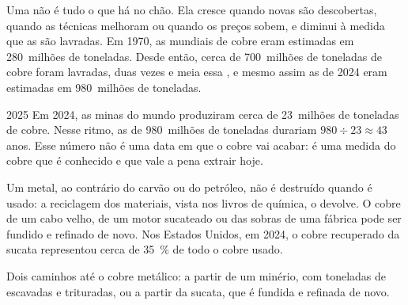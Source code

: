 Uma  não é tudo o que há no chão. Ela cresce quando novas 
são descobertas, quando as técnicas melhoram ou quando os preços sobem, e
diminui à medida que as  são lavradas. Em 1970, as 
mundiais de cobre eram estimadas em 280~milhões de toneladas. Desde
então, cerca de 700~milhões de toneladas de cobre foram lavradas, duas
vezes e meia essa , e mesmo assim as  de 2024 eram
estimadas em 980~milhões de toneladas.

\begin{dated}{2025}
Em 2024, as minas do mundo produziram cerca de 23~milhões de toneladas de
cobre. Nesse ritmo, as  de 980~milhões de toneladas durariam
$980 \div 23
\approx 43$ anos. Esse número não é uma data em que o cobre vai acabar: é
uma medida do cobre que é conhecido e que vale a pena extrair hoje.
\end{dated}

Um metal, ao contrário do carvão ou do petróleo, não é destruído quando
é usado: a reciclagem dos materiais, vista nos livros de química, o
devolve. O cobre de um cabo velho, de um motor sucateado ou das sobras de
uma fábrica pode ser fundido e refinado de novo. Nos Estados Unidos, em
2024, o cobre recuperado da sucata representou cerca de \qty{35}{\%} de
todo o cobre usado.

\begin{omfigure}

{\small Dois caminhos até o cobre metálico: a partir de um minério, com
toneladas de  escavadas e trituradas, ou a partir da sucata, que é
fundida e refinada de novo.}
\end{omfigure}

